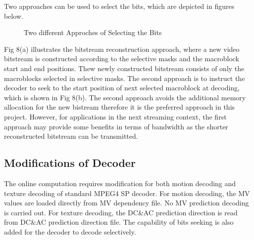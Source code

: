 Two approaches can be used to select the bits, which are depicted in figures below.
\begin{figure}
\centering
\quad
{}
\caption{Two different Approches of Selecting the Bits}
\end{figure}
Fig 8(a) illustrates the bitstream reconstruction approach, where a new video bitstream is constructed according to the selective masks and the macroblock start and end positions. Thew newly constructed bitstream consists of only the macroblocks selected in selective masks. The second approach is to instruct the decoder to seek to the start position of next selected macroblock at decoding, which is shown in Fig 8(b). The second approach avoids the additional memory allocation for the new bistream therefore it is the preferred approach in this project. However, for applications in the next streaming context, the first approach may provide some benefits in terms of bandwidth as the shorter reconstructed bitstream can be transmitted. 
\subsection{Modifications of Decoder}
The online computation requires modification for both motion decoding and texture decoding of standard MPEG4 SP decoder. For motion decoding, the MV values are loaded directly from MV dependency file. No MV prediction decoding is carried out. For texture decoding, the DC\&AC prediction direction is read from DC\&AC prediction direction file. The capability of bits seeking is also added for the decoder to decode selectively. 
  

